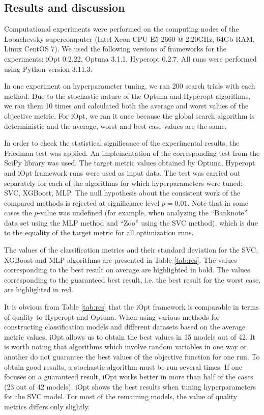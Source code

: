\documentclass[preprint,12pt]{elsarticle}
\begin{document}
\subsection{Results and discussion}

Computational experiments were performed on the computing nodes of the Lobachevsky supercomputer (Intel Xeon CPU E5-2660 @ 2.20GHz, 64Gb RAM, Linux CentOS 7). We used the following versions of frameworks for the experiments: iOpt 0.2.22, Optuna 3.1.1, Hyperopt 0.2.7. All runs were performed using Python version 3.11.3.

In one experiment on hyperparameter tuning, we ran 200 search trials with each method. Due to the stochastic nature of the Optuna and Hyperopt algorithms, we ran them 10 times and calculated both the average and worst values of the objective  metric. For iOpt, we ran it once because the global search algorithm is deterministic and the average, worst and best case values are the same.

In order to check the statistical significance of the experimental results, the Friedman test was applied. An implementation of the corresponding test from the SciPy library was used. The target metric values obtained by Optuna, Hyperopt and iOpt framework runs were used as input data. The test was carried out separately for each of the algorithms for which hyperparameters were tuned: SVC, XGBoost, MLP. The null hypothesis about the consistent work of the compared methods is rejected at significance level $p=0.01$. Note that in some cases the $p$-value was undefined (for example, when analyzing the ``Banknote'' data set using the MLP method and ``Zoo'' using the SVC method), which is due to the equality of the target metric for all optimization runs.

The values of the classification metrics and their standard deviation for the SVC, XGBoost and MLP algorithms are presented in Table \ref{tab:res}. 
The values corresponding to the best result on average are highlighted in bold. The values corresponding to the guaranteed best result, i.e. the best result for the worst case, are highlighted in red.

It is obvious from Table \ref{tab:res} that the iOpt framework is comparable in terms of quality to Hyperopt and Optuna. When using various methods for constructing classification models and different datasets based on the average metric values, iOpt allows us to obtain the best values in 15 models out of 42. 
It is worth noting that algorithms which involve random variables in one way or another do not guarantee the best values of the objective function for one run. To obtain good results, a stochastic algorithm must be run several times.
If one focuses on a guaranteed result, iOpt works better in more than half of the cases (23 out of 42 models). iOpt shows the best results when tuning hyperparameters for the SVC model. For most of the remaining models, the value of quality metrics differs only slightly. 
\end{document}
